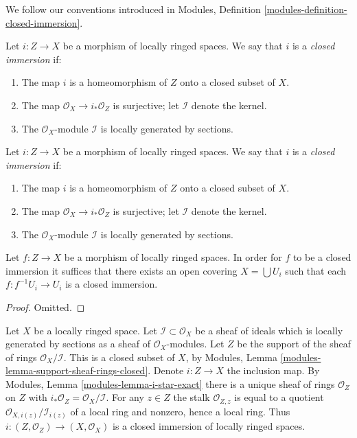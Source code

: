 \noindent
We follow our conventions introduced in
Modules, Definition \ref{modules-definition-closed-immersion}.

\begin{definition}
\label{definition-closed-immersion-locally-ringed-spaces}
Let $i : Z \to X$ be a morphism of locally ringed spaces.
We say that $i$ is a {\it closed immersion} if:
\begin{enumerate}
\item The map $i$ is a homeomorphism of $Z$ onto a closed subset of $X$.
\item The map $\mathcal{O}_X \to i_*\mathcal{O}_Z$ is surjective;
let $\mathcal{I}$ denote the kernel.
\item The $\mathcal{O}_X$-module $\mathcal{I}$
is locally generated by sections.
\end{enumerate}
\end{definition}

\begin{definition}
\label{definition-closed-immersion-locally-ringed-spaces}
Let $i : Z \to X$ be a morphism of locally ringed spaces.
We say that $i$ is a {\it closed immersion} if:
\begin{enumerate}
\item The map $i$ is a homeomorphism of $Z$ onto a closed subset of $X$.
\item The map $\mathcal{O}_X \to i_*\mathcal{O}_Z$ is surjective;
let $\mathcal{I}$ denote the kernel.
\item The $\mathcal{O}_X$-module $\mathcal{I}$
is locally generated by sections.
\end{enumerate}
\end{definition}

\begin{lemma}
\label{lemma-closed-local-target}
Let $f : Z \to X$ be a morphism of locally ringed spaces.
In order for $f$ to be a closed immersion it suffices
that there exists an open covering $X = \bigcup U_i$ such
that each $f : f^{-1}U_i \to U_i$ is a closed immersion.
\end{lemma}

\begin{proof}
Omitted.
\end{proof}

\begin{example}
\label{example-closed-subspace}
Let $X$ be a locally ringed space.
Let $\mathcal{I} \subset \mathcal{O}_X$ be a sheaf
of ideals which is locally generated by sections as a sheaf
of $\mathcal{O}_X$-modules. Let $Z$ be the support of
the sheaf of rings $\mathcal{O}_X/\mathcal{I}$.
This is a closed subset of $X$, by
Modules, Lemma \ref{modules-lemma-support-sheaf-rings-closed}.
Denote $i : Z \to X$ the inclusion map.
By Modules, Lemma \ref{modules-lemma-i-star-exact}
there is a unique sheaf of rings $\mathcal{O}_Z$ on $Z$
with $i_*\mathcal{O}_Z = \mathcal{O}_X/\mathcal{I}$.
For any $z \in Z$ the stalk $\mathcal{O}_{Z, z}$
is equal to a quotient $\mathcal{O}_{X, i(z)}/\mathcal{I}_{i(z)}$
of a local ring and nonzero, hence a local ring.
Thus $i : (Z, \mathcal{O}_Z) \to (X, \mathcal{O}_X)$ is
a closed immersion of locally ringed spaces.
\end{example}

